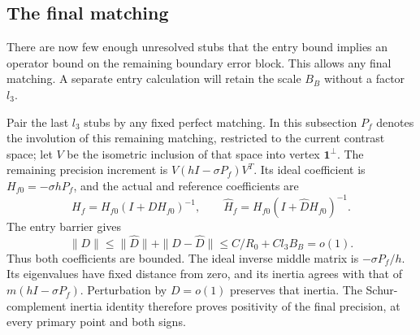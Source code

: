\subsection{The final matching}

There are now few enough unresolved stubs that the entry bound implies
an operator bound on the remaining boundary error block.  This allows any final
matching.  A separate entry calculation will retain the scale $B_B$
without a factor $l_3$.

Pair the last $l_3$ stubs by any fixed perfect matching.  In this
subsection $P_f$ denotes the involution of this remaining matching,
restricted to the current contrast space; let $V$ be the isometric
inclusion of that space into vertex $\mathbf1^\perp$.
The remaining precision increment is $V(hI-\sigma P_f)V^T$.
Its ideal coefficient is $H_{f0}=-\sigma hP_f$, and the actual
and reference coefficients are
\[
 H_f=H_{f0}(I+DH_{f0})^{-1},\qquad
 \widehat H_f=H_{f0}(I+\widehat D H_{f0})^{-1}.
\]
The entry barrier gives
\[
 \|D\|\le\|\widehat D\|+\|D-\widehat D\|
       \le C/R_0+Cl_3B_B=o(1).
\]
Thus both coefficients are bounded.  The ideal inverse middle
matrix is $-\sigma P_f/h$.  Its eigenvalues have fixed distance
from zero, and its inertia agrees with that of
$m(hI-\sigma P_f)$.  Perturbation by $D=o(1)$ preserves that
inertia.  The Schur-complement inertia identity therefore proves
positivity of the final precision, at every primary point and
both signs.


